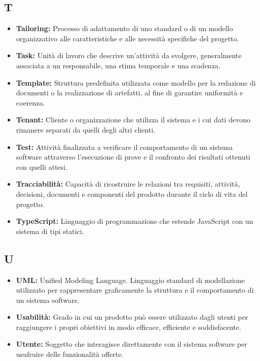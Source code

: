 {}
\subsection*{T}

\begin{itemize}
    \item \textbf{Tailoring:} Processo di adattamento di uno standard o di un modello organizzativo alle caratteristiche e alle necessità specifiche del progetto.
    \item \textbf{Task:} Unità di lavoro che descrive un'attività da svolgere, generalmente associata a un responsabile, una stima temporale e una scadenza.
    \item \textbf{Template:} Struttura predefinita utilizzata come modello per la redazione di documenti o la realizzazione di artefatti, al fine di garantire uniformità e coerenza.
    \item \textbf{Tenant:} Cliente o organizzazione che utilizza il sistema e i cui dati devono rimanere separati da quelli degli altri clienti.
    \item \textbf{Test:} Attività finalizzata a verificare il comportamento di un sistema software attraverso l'esecuzione di prove e il confronto dei risultati ottenuti con quelli attesi.
    \item \textbf{Tracciabilità:} Capacità di ricostruire le relazioni tra requisiti, attività, decisioni, documenti e componenti del prodotto durante il ciclo di vita del progetto.
    \item \textbf{TypeScript:} Linguaggio di programmazione che estende JavaScript con un sistema di tipi statici.
\end{itemize}


{}
\subsection*{U}

\begin{itemize}
    \item \textbf{UML:} Unified Modeling Language. Linguaggio standard di modellazione utilizzato per rappresentare graficamente la struttura e il comportamento di un sistema software.
    \item \textbf{Usabilità:} Grado in cui un prodotto può essere utilizzato dagli utenti per raggiungere i propri obiettivi in modo efficace, efficiente e soddisfacente.
    \item \textbf{Utente:} Soggetto che interagisce direttamente con il sistema software per usufruire delle funzionalità offerte.
\end{itemize}

